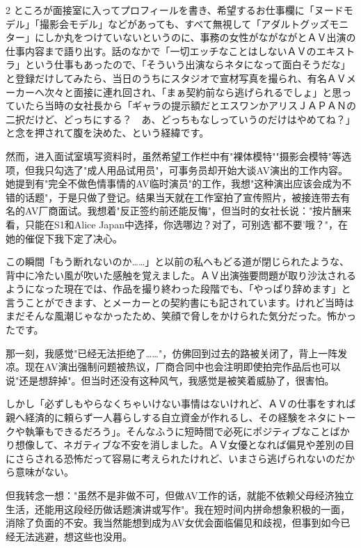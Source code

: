 \documentclass[12pt,UTF8]{ctexbook}
\begin{document}
\begin{paracol}{2}
ところが面接室に入ってプロフィールを書き、希望するお仕事欄に「ヌードモデル」「撮影会モデル」などがあっても、すべて無視して「アダルトグッズモニター」にしか丸をつけていないというのに、事務の女性がながながとＡＶ出演の仕事内容まで語り出す。話のなかで「一切エッチなことはしないＡＶのエキストラ」という仕事もあったので、「そういう出演ならネタになって面白そうだな」と登録だけしてみたら、当日のうちにスタジオで宣材写真を撮られ、有名ＡＶメーカーへ次々と面接に連れ回され、「まぁ契約前なら逃げられるでしょ」と思っていたら当時の女社長から「ギャラの提示額だとエスワンかアリスＪＡＰＡＮの二択だけど、どっちにする？　あ、どっちもなしっていうのだけはやめてね？」と念を押されて腹を決めた、という経緯です。

\switchcolumn

然而，进入面试室填写资料时，虽然希望工作栏中有"裸体模特""摄影会模特"等选项，但我只勾选了"成人用品试用员"，可事务员却开始大谈AV演出的工作内容。她提到有"完全不做色情事情的AV临时演员"的工作，我想"这种演出应该会成为不错的话题"，于是只做了登记。结果当天就在工作室拍了宣传照片，被接连带去有名的AV厂商面试。我想着"反正签约前还能反悔"，但当时的女社长说："按片酬来看，只能在S1和Alice Japan中选择，你选哪边？对了，可别选'都不要'哦？"，在她的催促下我下定了决心。

\switchcolumn*

この瞬間「もう断れないのか……」と以前の私へもどる道が閉じられたような、背中に冷たい風が吹いた感触を覚えました。ＡＶ出演強要問題が取り沙汰されるようになった現在では、作品を撮り終わった段階でも、「やっぱり辞めます」と言うことができます、とメーカーとの契約書にも記されています。けれど当時はまだそんな風潮じゃなかったため、笑顔で脅しをかけられた気分だった。怖かったです。

\switchcolumn

那一刻，我感觉"已经无法拒绝了……"，仿佛回到过去的路被关闭了，背上一阵发凉。现在AV演出强制问题被热议，厂商合同中也会注明即使拍完作品后也可以说"还是想辞掉"。但当时还没有这种风气，我感觉是被笑着威胁了，很害怕。

\switchcolumn*

しかし「必ずしもやらなくちゃいけない事情はないけれど、ＡＶの仕事をすれば親へ経済的に頼らず一人暮らしする自立資金が作れるし、その経験をネタにトークや執筆もできるだろう」。そんなふうに短時間で必死にポジティブなことばかり想像して、ネガティブな不安を消しました。ＡＶ女優となれば偏見や差別の目にさらされる恐怖だって容易に考えられたけれど、いまさら逃げられないのだから意味がない。

\switchcolumn

但我转念一想："虽然不是非做不可，但做AV工作的话，就能不依赖父母经济独立生活，还能用这段经历做话题演讲或写作"。我在短时间内拼命想象积极的一面，消除了负面的不安。我当然能想到成为AV女优会面临偏见和歧视，但事到如今已经无法逃避，想这些也没用。


\end{paracol}
\end{document}
